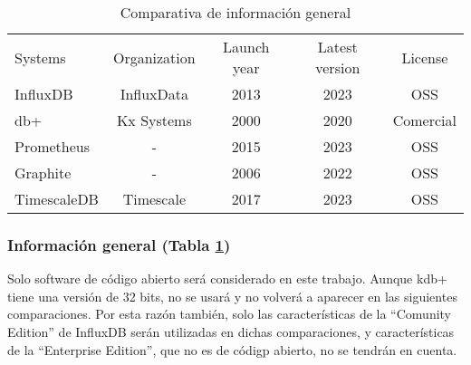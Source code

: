 \begin{table}[H]
    \begin{center}
        \begin{adjustbox}{max width=\textwidth}
            \begin{tabular}{l c c c c}
                \toprule
                Systems & Organization & Launch year & Latest version & License \\
                \otoprule
                InfluxDB    & InfluxData & 2013 & 2023 & OSS \\
                db+        & Kx Systems & 2000 & 2020 & Comercial \\
                Prometheus  & -          & 2015 & 2023 & OSS \\
                Graphite    & -          & 2006 & 2022 & OSS \\
                TimescaleDB & Timescale  & 2017 & 2023 & OSS \\
                \bottomrule
            \end{tabular}
        \end{adjustbox}
        \caption{Comparativa de información general}
        \label{tabla:gisgbd}
    \end{center}
\end{table}

\subsubsection{Información general (Tabla \ref*{tabla:gisgbd})} Solo software de código abierto será considerado en este
trabajo. Aunque kdb+ tiene una versión de 32 bits, no se usará y no volverá a aparecer en las siguientes comparaciones.
Por esta razón también, solo las características de la ``Comunity Edition'' de InfluxDB serán utilizadas en dichas
comparaciones, y características de la ``Enterprise Edition'', que no es de códigp abierto, no se tendrán en cuenta.

